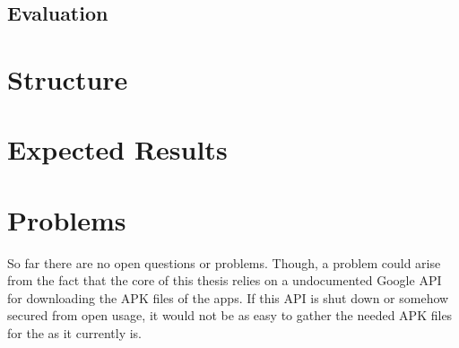 \documentclass[
	a4paper,
	oneside,
	12pt,
	liststotocnumbered
]{article}
\begin{document}
\subsection{Evaluation}

\section{Structure}

\section{Expected Results}

\section{Problems}
So far there are no open questions or problems. Though, a problem could arise from the fact that the core of this thesis relies on a undocumented Google \acs{API} for downloading the \acs{APK} files of the apps. 
If this \acs{API} is shut down or somehow secured from open usage, it would not be as easy to gather the needed \acs{APK} files for the \sca as it currently is.

\newpage
\printbibliography[title={References}]
\end{document}
